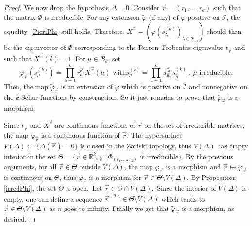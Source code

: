 \documentclass[10pt,a4paper]{amsart}
\theoremstyle{definition}
\DeclareMathOperator{\irr}{irr}
\begin{document}
\begin{proof}
We now drop the hypothesis $\Delta=0$. Consider $\vec{r}=(r_{1},\ldots,r_{k})$
such that the matrix $\Phi$ is irreducible. For any extension $\widetilde
{\varphi}$ (if any) of $\varphi$ positive on $\mathcal{I}$, the 
equality~\eqref{PieriPhi} still holds. Therefore, $X^{\vec{r}}=(\widetilde{\varphi
}(s_{\lambda}^{(k)})_{\lambda\in\mathcal{P}_{\irr }})$ should then be
the eigenvector of $\Phi$ corresponding to the Perron--Frobenius eigenvalue
$t_{\vec{r}}$ and such that $X^{\vec{r}}(\emptyset)=1$. For $\mu\in
\mathcal{B}_{k}$, set
\begin{equation}
\label{expression_morphism}\widetilde{\varphi}_{\vec{r}}(s_{\mu}^{(k)}%
)=\prod_{a=1}^{k}r_{a}^{p_{a}^{\mu}}X^{\vec{r}}(\widetilde{\mu})\text{ with
}s_{\mu}^{(k)}=\prod_{a=1}^{k}s_{R_{a}}^{p_{a}^{\mu}}s_{\widetilde{\mu}}%
^{(k)}\text{ , }\tilde{\mu}\text{ irreducible.}%
\end{equation}
Then, the map $\widetilde{\varphi}_{\vec{r}}$ is an extension of $\varphi$
which is positive on $\mathcal{I}$ and nonnegative on the $k$-Schur functions
by construction.\ So it just remains to prove that $\widetilde{\varphi}%
_{\vec{r}}$ is a morphism.

Since $t_{\vec{r}}$ and $X^{\vec{r}}$ are continuous functions of $\vec{r}$ on
the set of irreducible matrices, the map $\widetilde{\varphi}_{\vec{r}}$ is a
continuous function of $\vec{r}$. The hypersurface $V(\Delta):=\{\Delta
(\vec{r})=0\}$ is closed in the Zariski topology, thus $V(\Delta)$ has empty
interior in the set $\Theta=\{\vec{r}\in\mathbb{R}_{\geq0}^{k}\mid\Phi
_{(r_{1},\ldots,r_{k})}$ is irreducible$\}$. By the previous arguments, for
all $\vec{r}\in\Theta$ outside $V(\Delta)$, the map $\widetilde{\varphi}%
_{\vec{r}}$ is a morphism and $\vec{r}\mapsto\widetilde{\varphi}_{\vec{r}}$ is
continuous on $\Theta$, thus $\widetilde{\varphi}_{\vec{r}}$ is a morphism for
$\vec{r}\in\overline{\Theta\setminus V(\Delta)}$. By Proposition
\ref{irredPhi}, the set $\Theta$ is open.\ Let $\vec{r}\in\Theta\cap
V(\Delta)$.\ Since the interior of $V(\Delta)$ is empty, one can define a
sequence $\vec{r}^{(n)}\in\Theta\setminus V(\Delta)$ which tends to $\vec
{r}\in\overline{\Theta\setminus V(\Delta)}$ as $n$ goes to infinity. Finally
we get that $\widetilde{\varphi}_{\vec{r}}$ is a morphism, as desired.


\end{proof}
\end{document}
